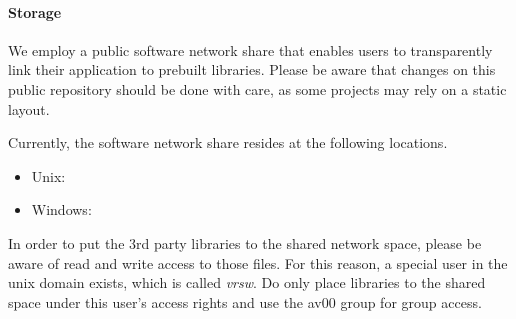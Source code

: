 \paragraph{Storage}
We employ a public software network share that enables users to transparently link their application to prebuilt libraries.
Please be aware that changes on this public repository should be done with care, as some projects may rely on a static layout.

Currently, the software network share resides at the following locations.
\begin{itemize}
\item Unix: 
\item Windows: 
\end{itemize}
In order to put the 3rd party libraries to the shared network space, please be aware of read and write access to those files.
For this reason, a special user in the unix domain exists, which is called \emph{vrsw}.
Do only place libraries to the shared space under this user's access rights and use the av00 group for group access.

